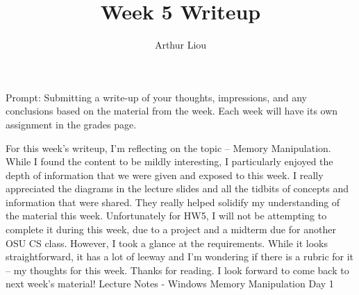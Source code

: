 \documentclass[12pt]{article}
\begin{document}
 
 
\title{Week 5 Writeup}
\author{Arthur Liou}

\maketitle

Prompt: Submitting a write-up of your thoughts, impressions, and any conclusions based on the material from the week. Each week will have its own assignment in the grades page.
\par

\linebreak
	For this week’s writeup, I’m reflecting on the topic – Memory Manipulation. While I found the content to be mildly interesting, I particularly enjoyed the depth of information that we were given and exposed to this week. I really appreciated the diagrams in the lecture slides and all the tidbits of concepts and information that were shared. They really helped solidify my understanding of the material this week. Unfortunately for HW5, I will not be attempting to complete it during this week, due to a project and a midterm due for another OSU CS class. However, I took a glance at the requirements. While it looks straightforward, it has a lot of leeway and I’m wondering if there is a rubric for it – my thoughts for this week. Thanks for reading. I look forward to come back to next week’s material! 
\newpage
Lecture Notes - Windows Memory Manipulation
\newline
Day 1
\end{document}
